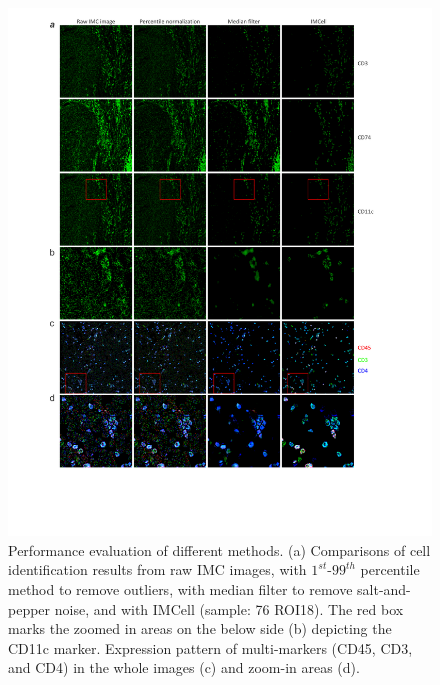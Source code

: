 \documentclass{mynature}
\begin{document}
\begin{figure}[!htb]
  \centering
  \includegraphics[width=0.9\linewidth]{Figure/Figure2.pdf}
  \caption{ Performance evaluation of different methods. 
  (a) Comparisons of cell identification results from raw IMC images, with $1^{st}$-$99^{th}$ percentile method to remove outliers, with median filter to remove salt-and-pepper noise, and with IMCell (sample: 76 ROI18). The red box marks the zoomed in areas on the below side (b) depicting the CD11c marker.
  Expression pattern of multi-markers (CD45, CD3, and CD4) in the whole images (c) and zoom-in areas (d). 
  }
  \label{fig2:imgs}
\end{figure}
\end{document}
